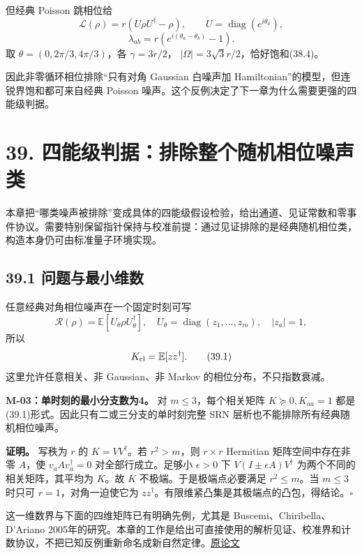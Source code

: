 \documentclass[
  11pt,
  oneside]{book}
\begin{document}
但经典 Poisson 跳相位给 \[
\mathcal L(\rho)=r(U\rho U^\dagger-\rho),\qquad
U=\operatorname{diag}(e^{i\theta_a}),
\] \[
\lambda_{ab}=r(e^{i(\theta_a-\theta_b)}-1).
\tag{38.7}
\] 取 \(\theta=(0,2\pi/3,4\pi/3)\)，各 \(\gamma=3r/2\)，
\(|\Omega|=3\sqrt3r/2\)，恰好饱和(38.4)。

因此非零循环相位排除``只有对角 Gaussian 白噪声加
Hamiltonian''的模型，但连锐界饱和都可来自经典 Poisson
噪声。这个反例决定了下一章为什么需要更强的四能级判据。

\chapter{39. 四能级判据：排除整个随机相位噪声类}\label{ch-39}\hypertarget{ch-39}{}

本章把``哪类噪声被排除''变成具体的四能级假设检验，给出通道、见证常数和零事件协议。需要特别保留指针保持与校准前提：通过见证排除的是经典随机相位类，构造本身仍可由标准量子环境实现。

\section{39.1 问题与最小维数}

任意经典对角相位噪声在一个固定时刻可写 \[
\mathcal R(\rho)=\mathbb E[U_\theta\rho U_\theta^\dagger],
\quad U_\theta=\operatorname{diag}(z_1,\ldots,z_m),\quad |z_a|=1,
\] 所以 \[
K_{\rm cl}=\mathbb E[zz^\dagger].
\tag{39.1}
\] 这里允许任意相关、非 Gaussian、非 Markov 的相位分布，不只指数衰减。

\protect\hypertarget{m-03}{}{}

\textbf{M-03：单时刻的最小分支数为4。} 对 \(m\le3\)，每个相关矩阵
\(K\succeq0,K_{aa}=1\) 都是(39.1)形式。因此只有二或三分支的单时刻完整
SRN 层析也不能排除所有经典随机相位噪声。

\textbf{证明。} 写秩为 \(r\) 的 \(K=VV^\dagger\)。若 \(r^2>m\)，则
\(r\times r\) Hermitian 矩阵空间中存在非零 \(A\)，使
\(v_aAv_a^\dagger=0\) 对全部行成立。足够小 \(\epsilon>0\) 下
\(V(I\pm\epsilon A)V^\dagger\) 为两个不同的相关矩阵，其平均为 \(K\)。故
\(K\) 不极端。于是极端点必要满足 \(r^2\le m\)。当 \(m\le3\) 时只可
\(r=1\)，对角一迫使它为
\(zz^\dagger\)。有限维紧凸集是其极端点的凸包，得结论。\(\square\)

这一维数界与下面的四维矩阵已有明确先例，尤其是
Buscemi、Chiribella、D'Ariano
2005年的研究。本章的工作是给出可直接使用的解析见证、校准界和计数协议，不把已知反例重新命名成新自然定律。\href{https://doi.org/10.1103/PhysRevLett.95.090501}{原论文}
\end{document}
